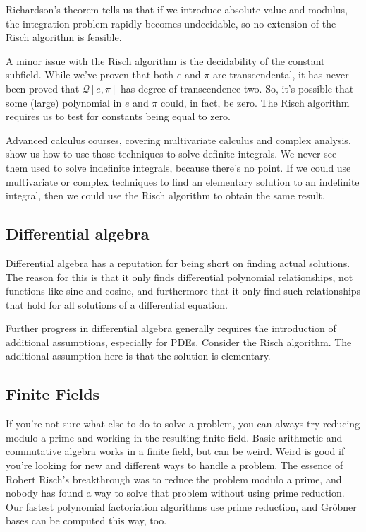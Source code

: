 \documentclass{article}
\begin{document}
Richardson's theorem tells us that if we introduce absolute value and modulus,
the integration problem rapidly becomes undecidable, so no extension of the
Risch algorithm is feasible.

A minor issue with the Risch algorithm is the decidability of the
constant subfield.  While we've proven that both $e$ and $\pi$ are transcendental,
it has never been proved that ${\mathcal Q}[e,\pi]$ has degree of transcendence two.
So, it's possible that some (large) polynomial in $e$ and $\pi$ could, in fact,
be zero.  The Risch algorithm requires us to test for constants being equal to zero.

Advanced calculus courses, covering multivariate calculus and complex analysis,
show us how to use those techniques to solve definite integrals.  We never
see them used to solve indefinite integrals, because there's no point.
If we could use multivariate or complex techniques to find an elementary
solution to an indefinite integral, then we could use the Risch algorithm
to obtain the same result.

\subsection*{Differential algebra}

Differential algebra has a reputation for being short on finding actual solutions.
The reason for this is that it only finds differential polynomial relationships,
not functions like sine and cosine, and furthermore that it only find such relationships
that hold for all solutions of a differential equation.

Further progress in differential algebra generally requires the introduction of
additional assumptions, especially for PDEs.  Consider
the Risch algorithm.  The additional assumption here is that the solution is elementary.

\subsection*{Finite Fields}

If you're not sure what else to do to solve a problem, you can always try reducing
modulo a prime and working in the resulting finite field.  Basic arithmetic and
commutative algebra works in a finite field, but can be weird.  Weird is good if
you're looking for new and different ways to handle a problem.  The essence
of Robert Risch's breakthrough was to reduce the problem modulo a prime,
and nobody has found a way to solve that problem without using prime
reduction.  Our fastest polynomial factoriation algorithms use prime
reduction, and Gr\"obner bases can be computed this way, too.
\end{document}
